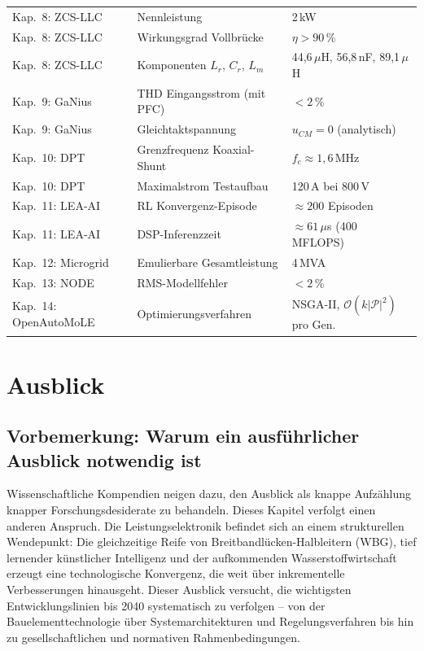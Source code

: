 ﻿\documentclass[a4paper,12pt,openany,oneside]{book}
\newcommand{\abschnitt}[1]{\section{#1}}
\theoremstyle{definition}
\begin{document}
\begin{longtable}{p{3.0cm}p{4.3cm}p{5.2cm}}
Kap.\ 8: ZCS-LLC &
  Nennleistung &
  2\,kW \\
Kap.\ 8: ZCS-LLC &
  Wirkungsgrad Vollbr\"ucke &
  $\eta > 90$\,\% \\
Kap.\ 8: ZCS-LLC &
  Komponenten $L_r$, $C_r$, $L_m$ &
  44{,}6\,$\mu$H, 56{,}8\,nF, 89{,}1\,$\mu$H \\
Kap.\ 9: GaNius &
  THD Eingangsstrom (mit PFC) &
  $< 2$\,\% \\
Kap.\ 9: GaNius &
  Gleichtaktspannung &
  $u_{CM} = 0$ (analytisch) \\
Kap.\ 10: DPT &
  Grenzfrequenz Koaxial-Shunt &
  $f_c \approx 1{,}6$\,MHz \\
Kap.\ 10: DPT &
  Maximalstrom Testaufbau &
  120\,A bei 800\,V \\
Kap.\ 11: LEA-AI &
  RL Konvergenz-Episode &
  $\approx 200$ Episoden \\
Kap.\ 11: LEA-AI &
  DSP-Inferenzzeit &
  $\approx 61$\,$\mu$s (400\,MFLOPS) \\
Kap.\ 12: Microgrid &
  Emulierbare Gesamtleistung &
  4\,MVA \\
Kap.\ 13: NODE &
  RMS-Modellfehler &
  $< 2$\,\% \\
Kap.\ 14: OpenAutoMoLE &
  Optimierungsverfahren &
  NSGA-II, $\mathcal{O}(k|\mathcal{P}|^2)$ pro Gen. \\
\end{longtable}
\addtocounter{table}{-1}
\begin{table}[H]
  \caption{Quantitative Kenngr\"o\ss{}en aller 14 Kapitel im \"Uberblick.}
  \label{tab:kennzahlen}
\end{table}

\chapter{Ausblick}
\label{kap:ausblick}

\abschnitt{Vorbemerkung: Warum ein ausf\"uhrlicher Ausblick notwendig ist}

Wissenschaftliche Kompendien neigen dazu, den Ausblick als knappe Aufz\"ahlung knapper
Forschungsdesiderate zu behandeln. Dieses Kapitel verfolgt einen anderen Anspruch.
Die Leistungselektronik befindet sich an einem strukturellen Wendepunkt: Die gleichzeitige
Reife von Breitbandl\"ucken-Halbleitern (WBG), tief lernender k\"unstlicher Intelligenz und
der aufkommenden Wasserstoffwirtschaft erzeugt eine technologische Konvergenz, die weit
\"uber inkrementelle Verbesserungen hinausgeht. Dieser Ausblick versucht, die wichtigsten
Entwicklungslinien bis 2040 systematisch zu verfolgen -- von der Bauelementtechnologie
\"uber Systemarchitekturen und Regelungsverfahren bis hin zu gesellschaftlichen und
normativen Rahmenbedingungen.
\end{document}
